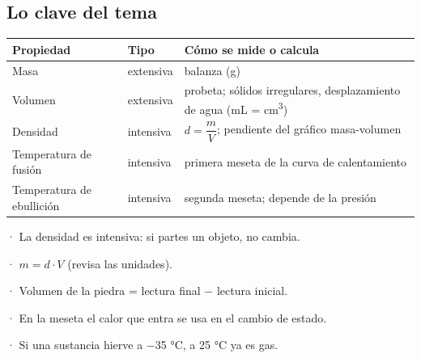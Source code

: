 \subsection{Lo clave del tema}
\begin{center}\small
\begin{tabularx}{\linewidth}{@{}>{\raggedright\arraybackslash\hsize=0.97\hsize}X>{\raggedright\arraybackslash\hsize=0.47\hsize}X>{\raggedright\arraybackslash\hsize=1.56\hsize}X@{}}
\toprule
\textbf{Propiedad} & \textbf{Tipo} & \textbf{Cómo se mide o calcula} \\
\midrule
Masa & extensiva & balanza (g) \\
Volumen & extensiva & probeta; sólidos irregulares, desplazamiento de agua (mL = cm\textsuperscript{3}) \\
Densidad & intensiva & $d = \dfrac{m}{V}$; pendiente del gráfico masa-volumen \\
Temperatura de fusión & intensiva & primera meseta de la curva de calentamiento \\
Temperatura de ebullición & intensiva & segunda meseta; depende de la presión \\
\bottomrule
\end{tabularx}
\end{center}
 
\begin{clave}[{Recuerda}] · La densidad es intensiva: si partes un objeto, no cambia.\par · $m = d\cdot V$ (revisa las unidades).\par · Volumen de la piedra = lectura final \ensuremath{-} lectura inicial.\par · En la meseta el calor que entra se usa en el cambio de estado.\par · Si una sustancia hierve a \ensuremath{-}35 °C, a 25 °C ya es gas.\end{clave}
 
